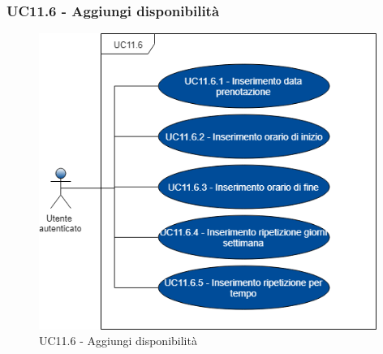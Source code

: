 \subsubsection{UC11.6 - Aggiungi disponibilità}
\begin{figure}[H]
	\includegraphics[width=11cm]{res/images/UC11Aggiungi.png}
	\centering
	\caption{UC11.6 - Aggiungi disponibilità}
\end{figure}
